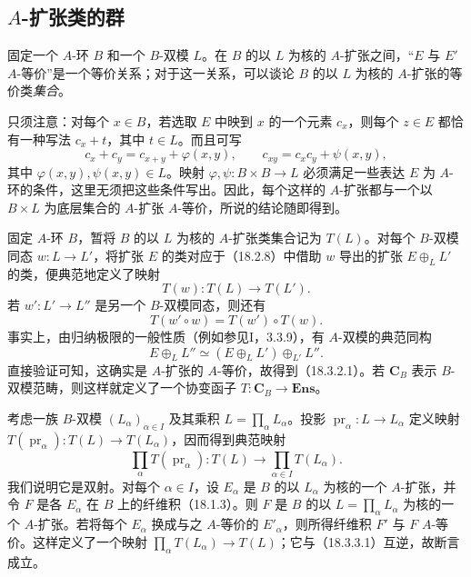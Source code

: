 \subsection{\texorpdfstring{$A$}{A}-扩张类的群}
固定一个 $A$-环 $B$ 和一个 $B$-双模 $L$。在 $B$ 的以 $L$ 为核的 $A$-扩张之间，“$E$ 与 $E'$ $A$-等价”是一个等价关系；对于这一关系，可以谈论 $B$ 的以 $L$ 为核的 $A$-扩张的等价类\emph{集合}。

只须注意：对每个 $x\in B$，若选取 $E$ 中映到 $x$ 的一个元素 $c_x$，则每个 $z\in E$ 都恰有一种写法 $c_x+t$，其中 $t\in L$。而且可写
\[
 c_x+c_y=c_{x+y}+\varphi(x,y),\qquad
 c_{xy}=c_xc_y+\psi(x,y),
\]
其中 $\varphi(x,y),\psi(x,y)\in L$。映射 $\varphi,\psi:B\times B\to L$ 必须满足一些表达 $E$ 为 $A$-环的条件，这里无须把这些条件写出。因此，每个这样的 $A$-扩张都与一个以 $B\times L$ 为底层集合的 $A$-扩张 $A$-等价，所说的结论随即得到。

固定 $A$-环 $B$，暂将 $B$ 的以 $L$ 为核的 $A$-扩张类集合记为 $T(L)$。对每个 $B$-双模同态 $w:L\to L'$，将扩张 $E$ 的类对应于（18.2.8）中借助 $w$ 导出的扩张 $E\oplus_LL'$ 的类，便典范地定义了映射
\[
 T(w):T(L)\longrightarrow T(L').
\]
若 $w':L'\to L''$ 是另一个 $B$-双模同态，则还有
\begin{equation}
 T(w'\circ w)=T(w')\circ T(w).
 \tag{18.3.2.1}
\end{equation}
事实上，由归纳极限的一般性质（例如参见I，3.3.9），有 $A$-双模的典范同构
\[
 E\oplus_LL''\simeq (E\oplus_LL')\oplus_{L'}L''.
\]
直接验证可知，这确实是 $A$-扩张的 $A$-等价，故得到（18.3.2.1）。若 $\mathbf C_B$ 表示 $B$-双模范畴，则这样就定义了一个协变函子 $T:\mathbf C_B\to\mathbf{Ens}$。

考虑一族 $B$-双模 $(L_\alpha)_{\alpha\in I}$ 及其乘积 $L=\prod_\alpha L_\alpha$。投影 $\operatorname{pr}_\alpha:L\to L_\alpha$ 定义映射 $T(\operatorname{pr}_\alpha):T(L)\to T(L_\alpha)$，因而得到典范映射
\begin{equation}
 \prod_\alpha T(\operatorname{pr}_\alpha):
 T(L)\longrightarrow\prod_{\alpha\in I}T(L_\alpha).
 \tag{18.3.3.1}
\end{equation}
我们说明它是双射。对每个 $\alpha\in I$，设 $E_\alpha$ 是 $B$ 的以 $L_\alpha$ 为核的一个 $A$-扩张，并令 $F$ 是各 $E_\alpha$ 在 $B$ 上的纤维积（18.1.3）。则 $F$ 是 $B$ 的以 $L=\prod_\alpha L_\alpha$ 为核的一个 $A$-扩张。若将每个 $E_\alpha$ 换成与之 $A$-等价的 $E'_\alpha$，则所得纤维积 $F'$ 与 $F$ $A$-等价。这样定义了一个映射 $\prod_\alpha T(L_\alpha)\to T(L)$；它与（18.3.3.1）互逆，故断言成立。

